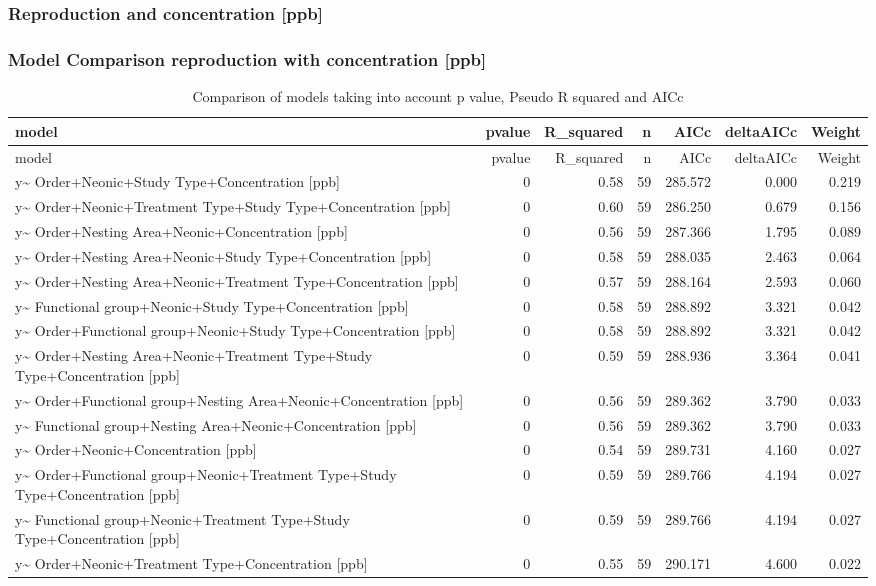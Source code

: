 \documentclass[]{elsarticle} %
\begin{document}
\subsubsection{Reproduction and concentration
{[}ppb{]}}\label{reproduction-and-concentration-ppb}

\subsubsection{Model Comparison reproduction with concentration
{[}ppb{]}}\label{model-comparison-reproduction-with-concentration-ppb}

\begin{longtable}[c]{@{}lrrrrrr@{}}
\caption{Comparison of models taking into account p value, Pseudo R
squared and AICc}\tabularnewline
\toprule
model & pvalue & R\_squared & n & AICc & deltaAICc &
Weight\tabularnewline
\midrule
\endfirsthead
\toprule
model & pvalue & R\_squared & n & AICc & deltaAICc &
Weight\tabularnewline
\midrule
\endhead
y\textasciitilde{} Order+Neonic+Study Type+Concentration {[}ppb{]} & 0 &
0.58 & 59 & 285.572 & 0.000 & 0.219\tabularnewline
y\textasciitilde{} Order+Neonic+Treatment Type+Study Type+Concentration
{[}ppb{]} & 0 & 0.60 & 59 & 286.250 & 0.679 & 0.156\tabularnewline
y\textasciitilde{} Order+Nesting Area+Neonic+Concentration {[}ppb{]} & 0
& 0.56 & 59 & 287.366 & 1.795 & 0.089\tabularnewline
y\textasciitilde{} Order+Nesting Area+Neonic+Study Type+Concentration
{[}ppb{]} & 0 & 0.58 & 59 & 288.035 & 2.463 & 0.064\tabularnewline
y\textasciitilde{} Order+Nesting Area+Neonic+Treatment
Type+Concentration {[}ppb{]} & 0 & 0.57 & 59 & 288.164 & 2.593 &
0.060\tabularnewline
y\textasciitilde{} Functional group+Neonic+Study Type+Concentration
{[}ppb{]} & 0 & 0.58 & 59 & 288.892 & 3.321 & 0.042\tabularnewline
y\textasciitilde{} Order+Functional group+Neonic+Study
Type+Concentration {[}ppb{]} & 0 & 0.58 & 59 & 288.892 & 3.321 &
0.042\tabularnewline
y\textasciitilde{} Order+Nesting Area+Neonic+Treatment Type+Study
Type+Concentration {[}ppb{]} & 0 & 0.59 & 59 & 288.936 & 3.364 &
0.041\tabularnewline
y\textasciitilde{} Order+Functional group+Nesting
Area+Neonic+Concentration {[}ppb{]} & 0 & 0.56 & 59 & 289.362 & 3.790 &
0.033\tabularnewline
y\textasciitilde{} Functional group+Nesting Area+Neonic+Concentration
{[}ppb{]} & 0 & 0.56 & 59 & 289.362 & 3.790 & 0.033\tabularnewline
y\textasciitilde{} Order+Neonic+Concentration {[}ppb{]} & 0 & 0.54 & 59
& 289.731 & 4.160 & 0.027\tabularnewline
y\textasciitilde{} Order+Functional group+Neonic+Treatment Type+Study
Type+Concentration {[}ppb{]} & 0 & 0.59 & 59 & 289.766 & 4.194 &
0.027\tabularnewline
y\textasciitilde{} Functional group+Neonic+Treatment Type+Study
Type+Concentration {[}ppb{]} & 0 & 0.59 & 59 & 289.766 & 4.194 &
0.027\tabularnewline
y\textasciitilde{} Order+Neonic+Treatment Type+Concentration {[}ppb{]} &
0 & 0.55 & 59 & 290.171 & 4.600 & 0.022\tabularnewline
\bottomrule
\end{longtable}
\end{document}
